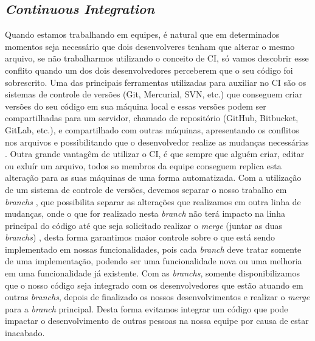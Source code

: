       \subsection{\textit{Continuous Integration}}
        Quando estamos trabalhando em equipes, é natural que em determinados momentos
        seja necessário que dois desenvolveres tenham que alterar o mesmo arquivo,
        se não trabalharmos utilizando o conceito de CI, só vamos descobrir esse
        conflito quando um dos dois desenvolvedores perceberem que o seu código
        foi sobrescrito. Uma das principais ferramentas utilizadas para auxiliar
        no CI são os sistemas de controle de versões (Git, Mercurial, SVN, etc.)
        que conseguem criar versões do seu código em sua máquina local e essas versões
        podem ser compartilhadas para um servidor, chamado de repositório (GitHub,
        Bitbucket, GitLab, etc.), e compartilhado com outras máquinas, apresentando
        os conflitos nos arquivos e possibilitando que o desenvolvedor realize as
        mudanças necessárias \cite{ProGit}. Outra grande vantagêm de utilizar o CI,
        é que sempre que alguém criar, editar ou exluír um arquivo, todos so membros
        da equipe conseguem replica esta alteração para as suas máquinas de uma forma
        automatizada. \newline
        Com a utilização de um sistema de controle de versões, devemos separar o
        nosso trabalho em \textit{branchs} \cite{TheDevOpsHandbook}, que possibilita
        separar as alterações que realizamos em outra linha de mudanças, onde
        o que for realizado nesta \textit{branch} não terá impacto na linha
        principal do código até que seja solicitado realizar o \textit{merge}
        (juntar as duas \textit{branchs}) \cite{ProGit}, desta forma garantimos maior
        controle sobre o que está sendo implementado em nossas funcionalidades, pois
        cada \textit{branch} deve tratar somente de uma implementação, podendo ser
        uma funcionalidade nova ou uma melhoria em uma funcionalidade já existente.
        Com as \textit{branchs}, somente disponibilizamos que o nosso código seja
        integrado com os desenvolvedores que estão atuando em outras \textit{branchs},
        depois de finalizado os nossos desenvolvimentos e realizar o \textit{merge}
        para a \textit{branch} principal. Desta forma evitamos integrar um código
        que pode impactar o desenvolvimento de outras pessoas na nossa equipe por
        causa de estar inacabado. \newline

